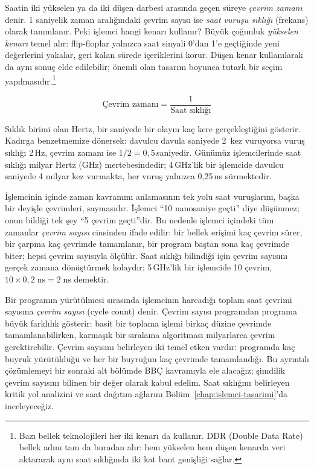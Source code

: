 Saatin iki yükselen ya da iki düşen darbesi arasında geçen süreye \emph{çevrim zamanı} denir. 1 saniyelik zaman aralığındaki çevrim sayısı ise \emph{saat vuruşu sıklığı} (frekans) olarak tanımlanır. Peki işlemci hangi kenarı kullanır? Büyük çoğunluk \emph{yükselen kenarı} temel alır: flip-floplar yalnızca saat sinyali 0'dan 1'e geçtiğinde yeni değerlerini yakalar, geri kalan sürede içeriklerini korur. Düşen kenar kullanılarak da aynı sonuç elde edilebilir; önemli olan tasarım boyunca tutarlı bir seçim yapılmasıdır.\footnote{Bazı bellek teknolojileri her iki kenarı da kullanır. DDR (Double Data Rate) bellek adını tam da buradan alır: hem yükselen hem düşen kenarda veri aktararak aynı saat sıklığında iki kat bant genişliği sağlar.}

\begin{equation}
\text{Çevrim zamanı} = \frac{1}{\text{Saat sıklığı}}
\label{eq:cevrim-zamani}
\end{equation}

Sıklık birimi olan Hertz, bir saniyede bir olayın kaç kere gerçekleştiğini gösterir. Kadırga benzetmemize dönersek: davulcu davula saniyede 2~kez vuruyorsa vuruş sıklığı 2\,Hz, çevrim zamanı ise $1/2 = 0{,}5$\,saniyedir. Günümüz işlemcilerinde saat sıklığı milyar Hertz (GHz) mertebesindedir; 4\,GHz'lik bir işlemcide davulcu saniyede 4 milyar kez vurmakta, her vuruş yalnızca 0,25\,ns sürmektedir.

İşlemcinin içinde zaman kavramını anlamasının tek yolu saat vuruşlarını, başka bir deyişle çevrimleri, saymasıdır. İşlemci ``10 nanosaniye geçti'' diye düşünmez; onun bildiği tek şey ``5 çevrim geçti''dir. Bu nedenle işlemci içindeki tüm zamanlar \emph{çevrim sayısı} cinsinden ifade edilir: bir bellek erişimi kaç çevrim sürer, bir çarpma kaç çevrimde tamamlanır, bir program baştan sona kaç çevrimde biter; hepsi çevrim sayısıyla ölçülür. Saat sıklığı bilindiği için çevrim sayısını gerçek zamana dönüştürmek kolaydır: 5\,GHz'lik bir işlemcide 10 çevrim, $10 \times 0{,}2\;\text{ns} = 2\;\text{ns}$ demektir.

Bir programın yürütülmesi sırasında işlemcinin harcadığı toplam saat çevrimi sayısına \emph{çevrim sayısı} (cycle count) denir. Çevrim sayısı programdan programa büyük farklılık gösterir: basit bir toplama işlemi birkaç düzine çevrimde tamamlanabilirken, karmaşık bir sıralama algoritması milyarlarca çevrim gerektirebilir. Çevrim sayısını belirleyen iki temel etken vardır: programda kaç buyruk yürütüldüğü ve her bir buyruğun kaç çevrimde tamamlandığı. Bu ayrıntılı çözümlemeyi bir sonraki alt bölümde BBÇ kavramıyla ele alacağız; şimdilik çevrim sayısını bilinen bir değer olarak kabul edelim. Saat sıklığını belirleyen kritik yol analizini ve saat dağıtım ağlarını Bölüm~\ref{chap:islemci-tasarimi}'da inceleyeceğiz.

